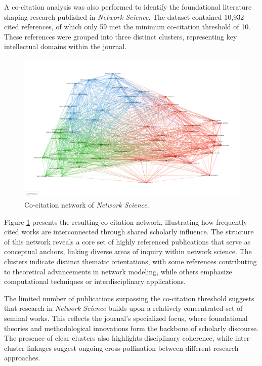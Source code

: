 \documentclass[twocolumn]{article}
\begin{document}
		A co-citation analysis was also performed to identify the foundational literature shaping research published in \textit{Network Science}. The dataset contained 10,932 cited references, of which only 59 met the minimum co-citation threshold of 10. These references were grouped into three distinct clusters, representing key intellectual domains within the journal.
		
		\begin{figure}[htbp]
			\centering
			\includegraphics[width=\columnwidth]{"Network Science/VOS/Co-citation.pdf"}
			\caption{Co-citation network of \textit{Network Science}.}
			\label{fig.fig9}
		\end{figure}
		
		Figure \ref{fig.fig9} presents the resulting co-citation network, illustrating how frequently cited works are interconnected through shared scholarly influence. The structure of this network reveals a core set of highly referenced publications that serve as conceptual anchors, linking diverse areas of inquiry within network science. The clusters indicate distinct thematic orientations, with some references contributing to theoretical advancements in network modeling, while others emphasize computational techniques or interdisciplinary applications.
		
		The limited number of publications surpassing the co-citation threshold suggests that research in \textit{Network Science} builds upon a relatively concentrated set of seminal works. This reflects the journal’s specialized focus, where foundational theories and methodological innovations form the backbone of scholarly discourse. The presence of clear clusters also highlights disciplinary coherence, while inter-cluster linkages suggest ongoing cross-pollination between different research approaches.
		
\end{document}
